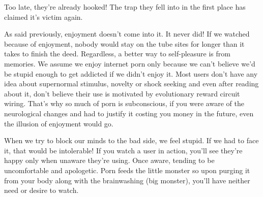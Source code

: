 \documentclass[easypeasy.tex]{subfiles}
\begin{document}
Too late, they're already hooked! The trap they fell into in the first place has claimed it's victim again.

As said previously, enjoyment doesn't come into it. It never did! If we watched because of enjoyment, nobody would stay on the tube sites for longer than it takes to finish the deed. Regardless, a better way to self-pleasure is from memories. We assume we enjoy internet porn only because we can't believe we'd be stupid enough to get addicted if we didn't enjoy it. Most users don't have any idea about supernormal stimulus, novelty or shock seeking and even after reading about it, don't believe their use is motivated by evolutionary reward circuit wiring. That's why so much of porn is subconscious, if you were aware of the neurological changes and had to justify it costing you money in the future, even the illusion of enjoyment would go.

When we try to block our minds to the bad side, we feel stupid. If we had to face it, that would be intolerable! If you watch a user in action, you'll see they're happy only when unaware they're using. Once aware, tending to be uncomfortable and apologetic. Porn feeds the little monster so upon purging it from your body along with the brainwashing (big monster), you'll have neither need or desire to watch.
\end{document}
